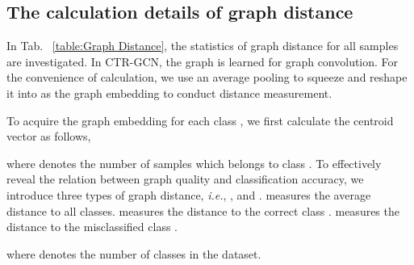 \documentclass{article} \usepackage{iclr2023_conference,times}
\begin{document}
\subsection{The calculation details of graph distance}
\label{app. graph distance}
In Tab. ~\ref{table:Graph Distance}, the statistics of graph distance for all samples are investigated. In CTR-GCN, the graph  is learned for graph convolution. For the convenience of calculation, we use an average pooling to squeeze  and reshape it into  as the graph embedding to conduct distance measurement. 

To acquire the graph embedding for each class , we first calculate the centroid vector  as follows,

where  denotes the number of samples which belongs to class .
To effectively reveal the relation between graph quality and classification accuracy, we introduce three types of graph distance, \emph{i.e.}, ,  and .  measures the average distance to all classes.  measures the distance to the correct class .  measures the distance to the misclassified class .   


where  denotes the number of classes in the dataset.
\end{document}
